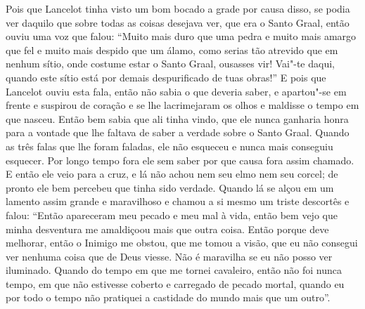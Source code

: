 Pois que Lancelot tinha visto um bom bocado a grade por causa disso, se podia
ver daquilo que sobre todas as coisas desejava ver, que era o Santo Graal,
então ouviu uma voz que falou: “Muito mais duro que uma pedra e muito mais
amargo que fel e muito mais despido que um álamo, como serias tão atrevido que
em nenhum sítio, onde costume estar o Santo Graal, ousasses vir! Vai"-te daqui,
quando este sítio está por demais despurificado de tuas obras!” E
pois que Lancelot ouviu esta fala, então não sabia o que deveria saber, e
apartou"-se em frente e suspirou de coração e se lhe lacrimejaram os olhos e
maldisse o tempo em que nasceu. Então bem sabia que ali tinha vindo, que ele
nunca ganharia honra para a vontade que lhe faltava de saber a verdade sobre o
Santo Graal. Quando as três falas que lhe foram faladas, ele não esqueceu e
nunca mais conseguiu esquecer. Por longo tempo fora ele sem saber por que causa
fora assim chamado. E então ele veio para a cruz, e lá não achou nem
seu elmo nem seu corcel; de pronto ele bem percebeu que tinha sido verdade.
Quando lá se alçou em um lamento assim grande e maravilhoso e chamou a si mesmo
um triste descortês e falou: “Então apareceram meu pecado e meu mal à vida,
então bem vejo que minha desventura me amaldiçoou mais que outra coisa. Então
porque deve melhorar, então o Inimigo me obstou, que me tomou a visão, que eu
não consegui ver nenhuma coisa que de Deus viesse. Não é maravilha se eu não
posso ver iluminado. Quando do tempo em que me tornei cavaleiro, então não foi
nunca tempo, em que não estivesse coberto e carregado de pecado mortal, quando
eu por todo o tempo não pratiquei a castidade do mundo mais que um outro”. 

